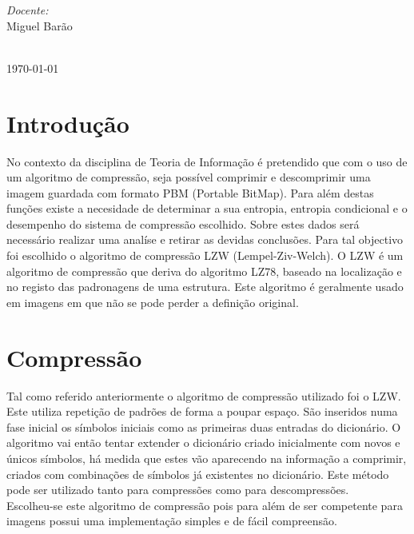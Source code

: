 \documentclass[12pt]{article}
\begin{document}
\begin{titlepage}
\begin{minipage}{0.4\textwidth}
\begin{flushleft} \large
\emph{Docente:} \\
Miguel Barão
\end{flushleft}
\end{minipage}\\[2cm]

{\large \today}\\[2cm]

\vfill
\end{titlepage}


\thispagestyle{empty}
\renewcommand\contentsname{Índice}
\tableofcontents
\newpage
{}


\printindex
\section{Introdução}
No contexto da disciplina de Teoria de Informação é pretendido que com o uso de um algoritmo de compressão, seja possível comprimir e descomprimir uma imagem guardada com formato PBM (Portable BitMap). Para além destas funções existe a necesidade de determinar a sua entropia, entropia condicional e o desempenho do sistema de compressão escolhido. Sobre estes dados será necessário realizar uma analíse e retirar as devidas conclusões. Para tal objectivo foi escolhido o algoritmo de compressão LZW (Lempel-Ziv-Welch). O LZW é um algoritmo de compressão que deriva do algoritmo LZ78, baseado na localização e no registo das padronagens de uma estrutura. Este algoritmo é geralmente usado em imagens em que não se pode perder a definição original. 

\newpage
{}

\printindex
\section{Compressão}
Tal como referido anteriormente o algoritmo de compressão utilizado foi o LZW. Este utiliza repetição de padrões de forma a poupar espaço.
São inseridos numa fase inicial os símbolos iniciais como as primeiras duas entradas do dicionário. 
O algoritmo vai então tentar extender o dicionário criado inicialmente com novos e únicos símbolos, há medida que estes vão aparecendo na informação a comprimir, criados com combinações de símbolos já existentes no dicionário. Este método pode ser utilizado tanto para compressões como para descompressões.\\[0.5cm]
Escolheu-se este algoritmo de compressão pois para além de ser competente para imagens possui uma implementação simples e de fácil compreensão. \\[0.5cm]
\end{document}
